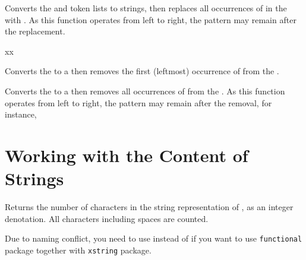 \documentclass[oneside]{book}
\begin{document}
\begin{function}{\strVarReplaceAll}
\begin{syntax}
   
\end{syntax}
Converts the  and  token lists to strings, then
replaces all occurrences of  in the
 with .
As this function
operates from left to right, the pattern 
may remain after the replacement.
\begin{demohigh}
\strSet {}
\strVarReplaceAll {} {xx}
\strUse \lTmpaStr
\end{demohigh}
\end{function}

\begin{function}{\strVarRemoveOnce}
\begin{syntax}
  
\end{syntax}
Converts the  to a  then
removes the first (leftmost) occurrence of  from the .
\begin{demohigh}
\strSet {}
\strVarRemoveOnce {}
\strUse \lTmpaStr
\end{demohigh}
\end{function}

\begin{function}{\strVarRemoveAll}
\begin{syntax}
  
\end{syntax}
Converts the  to a  then
removes all occurrences of  from the .
As this function operates from left to right,
the pattern  may remain after the removal, for instance,
\begin{demohigh}
\strSet {}
\strVarRemoveAll {}
\tlUse \lTmpaStr
\end{demohigh}
\end{function}

\section{Working with the Content of Strings}

\begin{function}{\strCount}
\begin{syntax}
 
\end{syntax}
Returns the number of characters in the string representation of ,
as an integer denotation. All characters including spaces are counted.
\begin{demohigh}
\end{demohigh}
Due to naming conflict, you need to use  instead of 
if you want to use \verb!functional! package together with \verb!xstring! package.
\end{function}
\end{document}
